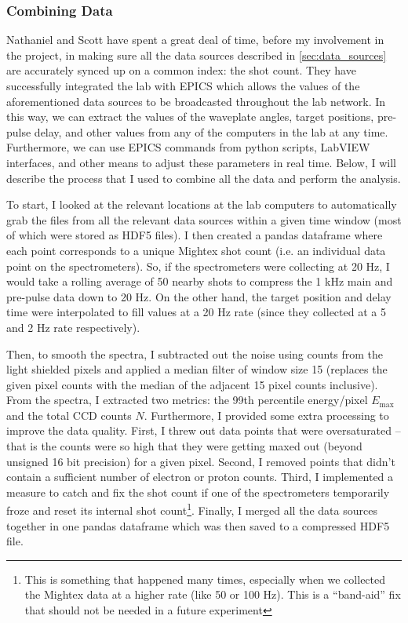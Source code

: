 \subsubsection{Combining Data}

Nathaniel and Scott have spent a great deal of time, before my involvement in the project, in making sure all the data sources described in \autoref{sec:data_sources} are accurately synced up on a common index: the shot count. They have successfully integrated the lab with \gls{EPICS} which allows the values of the aforementioned data sources to be broadcasted throughout the lab network. In this way, we can extract the values of the waveplate angles, target positions, pre-pulse delay, and other values from any of the computers in the lab at any time. Furthermore, we can use \gls{EPICS} commands from python scripts, LabVIEW interfaces, and other means to adjust these parameters in real time. Below, I will describe the process that I used to combine all the data and perform the analysis. 

To start, I looked at the relevant locations at the lab computers to automatically grab the files from all the relevant data sources within a given time window (most of which were stored as \gls{HDF5} files). I then created a pandas dataframe where each point corresponds to a unique Mightex shot count (i.e. an individual data point on the spectrometers). So, if the spectrometers were collecting at 20 Hz, I would take a rolling average of 50 nearby shots to compress the 1 kHz main and pre-pulse data down to 20 Hz. On the other hand, the target position and delay time were interpolated to fill values at a 20 Hz rate (since they collected at a 5 and 2 Hz rate respectively).

Then, to smooth the spectra, I subtracted out the noise using counts from the light shielded pixels and applied a median filter of window size 15 (replaces the given pixel counts with the median of the adjacent 15 pixel counts inclusive). From the spectra, I extracted two metrics: the 99th percentile energy/pixel $E_\text{max}$ and the total \gls{CCD} counts $N$. Furthermore, I provided some extra processing to improve the data quality. First, I threw out data points that were oversaturated -- that is the counts were so high that they were getting maxed out (beyond unsigned 16 bit precision) for a given pixel. Second, I removed points that didn't contain a sufficient number of electron or proton counts. Third, I implemented a measure to catch and fix the shot count if one of the spectrometers temporarily froze and reset its internal shot count\footnote{This is something that happened many times, especially when we collected the Mightex data at a higher rate (like 50 or 100 Hz). This is a ``band-aid'' fix that should not be needed in a future experiment}. Finally, I merged all the data sources together in one pandas dataframe which was then saved to a compressed \gls{HDF5} file.

